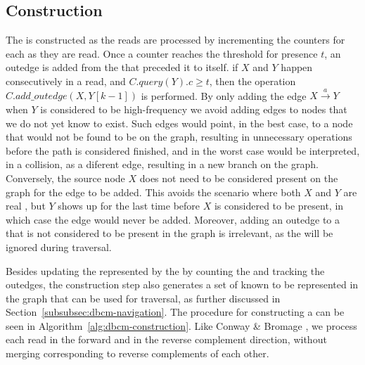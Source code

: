 \subsection{\dBCM Construction}
\label{subsubsec:dbcm-construction}

The \dBCM is constructed as the reads are processed by incrementing the counters for each \kmer as they are read. Once a  counter reaches the threshold for presence $t$, an outedge is added from the \kmer that preceded it to itself.  if  $X$ and $Y$ happen consecutively in a read, and $C.\mathit{query}(Y).c \geq t$, then the operation $C.\mathit{add\_outedge}(X, Y[k-1])$ is performed. 
%
%
%
By only adding the edge $X\stackrel{a}{\longrightarrow}Y$ when $Y$ is considered to be high-frequency we avoid adding edges to nodes that we do not yet know to exist. Such edges would point, in the best case, to a node that would not be found to be on the graph, resulting in unnecessary operations before the path is considered finished, and in the worst case would be interpreted, in a collision, as a diferent edge, resulting in a new branch on the graph. Conversely, the source node $X$ does not need to be considered present on the graph for the edge to be added. This avoids the scenario where both $X$ and $Y$ are real , but $Y$ shows up for the last time before $X$ is considered to be present, in which case the edge would never be added. Moreover, adding an outedge to a \kmer that is not considered to be present in the graph is irrelevant, as the \kmer will be ignored during traversal.

Besides updating the \dBG represented by the \dBCM by counting the  and tracking the outedges, the construction step also generates a set of  known to be represented in the graph that can be used for traversal, as further discussed in Section~\ref{subsubsec:dbcm-navigation}. The procedure for constructing a \dBCM can be seen in Algorithm~\ref{alg:dbcm-construction}. Like Conway \& Bromage \cite{Conway2011}, we process each read in the forward and in the reverse complement direction, without merging  corresponding to reverse complements of each other.

